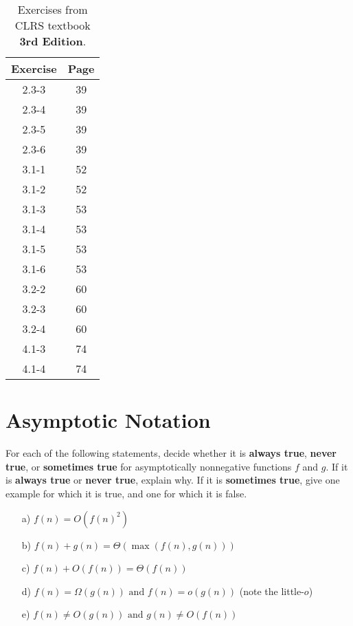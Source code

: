 \documentclass[12pt]{article}
\begin{document}
\begin{table}[t]
    \centering
    \begin{tabular}{c c}
        \toprule
        \textbf{Exercise} & \textbf{Page} \\
        \midrule
        2.3-3 & 39 \\
        2.3-4 & 39 \\
        2.3-5 & 39 \\
        2.3-6 & 39 \\
        3.1-1 & 52 \\
        3.1-2 & 52 \\
        3.1-3 & 53 \\
        3.1-4 & 53 \\
        3.1-5 & 53 \\
        3.1-6 & 53 \\
        3.2-2 & 60 \\
        3.2-3 & 60 \\
        3.2-4 & 60 \\
        4.1-3 & 74 \\
        4.1-4 & 74 \\
        \bottomrule
    \end{tabular}
    \caption{Exercises from CLRS textbook \textbf{3rd Edition}.}
    \label{tab:table}
\end{table}

\section{Asymptotic Notation}\label{sec:asymptotic}

For each of the following statements, decide whether it is \textbf{always true}, \textbf{never true}, or \textbf{sometimes true} for asymptotically nonnegative functions $f$ and $g$. If it is \textbf{always true} or \textbf{never true}, explain why. If it is \textbf{sometimes true}, give one example for which it is true, and one for which it is false.

\begin{enumerate}
    \item[a)] $f(n) = O(f(n)^2)$
    \item[b)] $f(n) + g(n) = \Theta(\max(f(n), g(n)))$
    \item[c)] $f(n) + O(f(n)) = \Theta(f(n))$
    \item[d)] $f(n) = \Omega(g(n)) \text{ and } f(n) = o(g(n))$ \hspace{5mm} (note the little-$o$)
    \item[e)] $f(n) \neq O(g(n)) \text{ and } g(n) \neq O(f(n))$
\end{enumerate}
\end{document}
